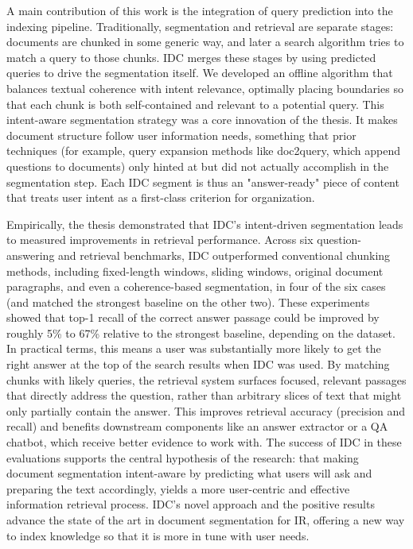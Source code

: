 \documentclass[12pt,a4paper]{report}
\begin{document}
A main contribution of this work is the integration of query prediction into the indexing pipeline. Traditionally, segmentation and retrieval are separate stages: documents are chunked in some generic way, and later a search algorithm tries to match a query to those chunks. IDC merges these stages by using predicted queries to drive the segmentation itself. We developed an offline algorithm that balances textual coherence with intent relevance, optimally placing boundaries so that each chunk is both self-contained and relevant to a potential query. This intent-aware segmentation strategy was a core innovation of the thesis. It makes document structure follow user information needs, something that prior techniques (for example, query expansion methods like doc2query, which append questions to documents) only hinted at but did not actually accomplish in the segmentation step. Each IDC segment is thus an "answer-ready" piece of content that treats user intent as a first-class criterion for organization.

Empirically, the thesis demonstrated that IDC's intent-driven segmentation leads to measured improvements in retrieval performance. Across six question-answering and retrieval benchmarks, IDC outperformed conventional chunking methods, including fixed-length windows, sliding windows, original document paragraphs, and even a coherence-based segmentation, in four of the six cases (and matched the strongest baseline on the other two). These experiments showed that top-1 recall of the correct answer passage could be improved by roughly 5\% to 67\% relative to the strongest baseline, depending on the dataset. In practical terms, this means a user was substantially more likely to get the right answer at the top of the search results when IDC was used. By matching chunks with likely queries, the retrieval system surfaces focused, relevant passages that directly address the question, rather than arbitrary slices of text that might only partially contain the answer. This improves retrieval accuracy (precision and recall) and benefits downstream components like an answer extractor or a QA chatbot, which receive better evidence to work with. The success of IDC in these evaluations supports the central hypothesis of the research: that making document segmentation intent-aware by predicting what users will ask and preparing the text accordingly, yields a more user-centric and effective information retrieval process. IDC's novel approach and the positive results advance the state of the art in document segmentation for IR, offering a new way to index knowledge so that it is more in tune with user needs.
\end{document}
